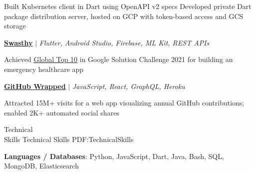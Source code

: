 \documentclass[letterpaper,MMMyyyy,nonstopmode]{simpleresumecv}
\begin{document}
\begin{Body}
\begin{Detail}
\Gap
\BulletItem
Built Kubernetes client in Dart using OpenAPI v2 specs
\BulletItem
Developed private Dart package distribution server, hosted on GCP with token-based access and GCS storage
\end{Detail}

\BigGap

\Entry
\href{https://github.com/ishandeveloper/Swaasthy}
{\textbf{Swasthy}}
$|$ \emph{Flutter, Android Studio, Firebase, ML Kit, REST APIs}
\hfill
{}

\begin{Detail}
\Gap
\BulletItem
Achieved \underline{\href{https://developers.googleblog.com/en/meet-the-students-coding-their-way-to-a-better-world/}{Global Top 10}} in Google Solution Challenge 2021 for building an emergency healthcare app
\end{Detail}

\BigGap

\Entry
\href{https://github.com/ishandeveloper/github-wrapped}
{\textbf{GitHub Wrapped}}
$|$ \emph{JavaScript, React, GraphQL, Heroku}
\hfill
{}

\begin{Detail}
\Gap
\BulletItem
Attracted 15M+ visits for a web app visualizing annual GitHub contributions; enabled 2K+ automated social shares
\end{Detail}






\Section
{Technical\\Skills}
{Technical Skills}
{PDF:TechnicalSkills}

\textbf{Languages / Databases}: Python, JavaScript, Dart, Java, Bash, SQL, MongoDB, Elasticsearch


\end{Body}
\end{document}
